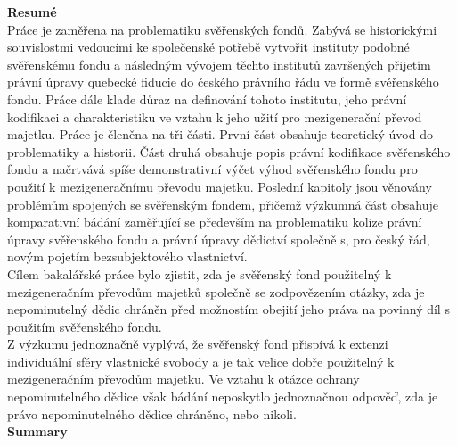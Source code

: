\documentclass{article}
\begin{document}
\newpage
	\thispagestyle{empty}
	\begin{center}
		\textbf{\Large Resumé}\\
			\vspace*{5mm}
			Práce je zaměřena na problematiku svěřenských fondů. Zabývá se historickými souvislostmi vedoucími ke společenské potřebě vytvořit instituty podobné svěřenskému fondu a následným vývojem těchto institutů završených přijetím právní úpravy quebecké fiducie do českého právního řádu ve formě svěřenského fondu. Práce dále klade důraz na definování tohoto institutu, jeho právní kodifikaci a charakteristiku ve vztahu k jeho užití pro mezigenerační převod majetku. Práce je členěna na tři části. První část obsahuje teoretický úvod do problematiky a historii. Část druhá obsahuje popis právní kodifikace svěřenského fondu a načrtvává spíše demonstrativní výčet výhod svěřenského fondu pro použití k mezigeneračnímu převodu majetku. Poslední kapitoly jsou věnovány problémům spojených se svěřenským fondem, přičemž výzkumná část obsahuje komparativní bádání zaměřující se především na problematiku kolize právní úpravy svěřenského fondu a právní úpravy dědictví společně s, pro český řád, novým pojetím bezsubjektového vlastnictví.\\
			\vspace*{5mm}
			Cílem bakalářské práce bylo zjistit, zda je svěřenský fond použitelný k mezigeneračním převodům majetků společně se zodpovězením otázky, zda je nepominutelný dědic chráněn před možnostím obejití jeho práva na povinný díl s použitím svěřenského fondu.\\
			\vspace*{5mm}
			Z výzkumu jednoznačně vyplývá, že svěřenský fond přispívá k extenzi individuální sféry vlastnické svobody a je tak velice dobře použitelný k mezigeneračním převodům majetku. Ve vztahu k otázce ochrany nepominutelného dědice však bádání neposkytlo jednoznačnou odpověď, zda je právo nepominutelného dědice chráněno, nebo nikoli.\\
		\vspace*{10mm}
		\textbf{\Large Summary}\\
			\vspace*{5mm}

\end{center}
\end{document}
